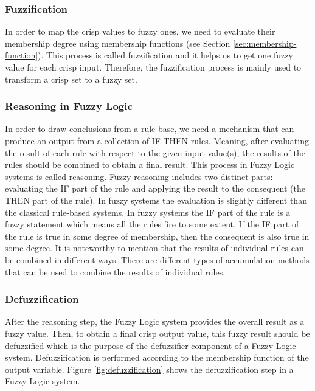 \documentclass[11pt]{article}
\begin{document}
\subsubsection{Fuzzification}
\label{sec:fuzzification}

In order to map the crisp values to fuzzy ones, we need to evaluate their
membership degree using membership functions (see Section
\ref{sec:membership-function}). This process is called fuzzification and it
helps us to get one fuzzy value for each crisp input. Therefore, the
fuzzification process is mainly used to transform a crisp set to a fuzzy set.

\subsubsection{Reasoning in Fuzzy Logic}
\label{sec:reasoning}

In order to draw conclusions from a rule-base, we need a mechanism that can
produce an output from a collection of IF-THEN rules. Meaning, after evaluating
the result of each rule with respect to the given input value(s), the results of
the rules should be combined to obtain a final result. This process in Fuzzy
Logic systems is called reasoning. Fuzzy reasoning includes two distinct parts:
evaluating the IF part of the rule and applying the result to the consequent
(the THEN part of the rule). In fuzzy systems the evaluation is slightly
different than the classical rule-based systems. In fuzzy systems the IF part of
the rule is a fuzzy statement which means all the rules fire to some extent. If
the IF part of the rule is true in some degree of membership, then the
consequent is also true in some degree. It is noteworthy to mention that the
results of individual rules can be combined in different ways. There are
different types of accumulation methods that can be used to combine the results
of individual rules.

\subsubsection{Defuzzification}
\label{sec:defuzzification}

After the reasoning step, the Fuzzy Logic system provides the overall result as
a fuzzy value. Then, to obtain a final crisp output value, this fuzzy result
should be defuzzified which is the purpose of the defuzzifier component of a
Fuzzy Logic system. Defuzzification is performed according to the membership
function of the output variable. Figure \ref{fig:defuzzification} shows the
defuzzification step in a Fuzzy Logic system.
\end{document}
